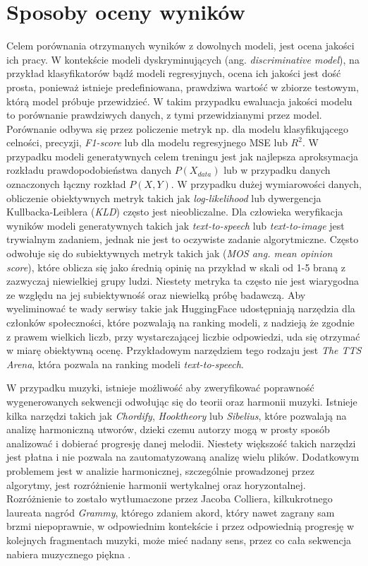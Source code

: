 \documentclass[data-science]{agh-wi} %
\begin{document}
\section{Sposoby oceny wyników}
Celem porównania otrzymanych wyników z dowolnych modeli, jest ocena jakości ich pracy. W kontekście modeli dyskryminujących (ang. \textit{discriminative model}), na przykład klasyfikatorów bądź modeli regresyjnych, ocena ich jakości jest dość prosta, ponieważ istnieje predefiniowana, prawdziwa wartość w zbiorze testowym, którą model próbuje przewidzieć. W takim przypadku ewaluacja jakości modelu to porównanie prawdziwych danych, z tymi przewidzianymi przez model. Porównanie odbywa się przez policzenie metryk np. dla modelu klasyfikującego celności, precyzji, \textit{F1-score} lub dla modelu regresyjnego MSE lub $R^2$. W przypadku modeli generatywnych celem treningu jest jak najlepsza aproksymacja rozkładu prawdopodobieństwa danych $P(X_{data})$ lub w przypadku danych oznaczonych łączny rozkład $P(X, Y)$. W przypadku dużej wymiarowości danych, obliczenie obiektywnych metryk takich jak \textit{log-likelihood} lub dywergencja Kullbacka-Leiblera (\textit{KLD}) często jest nieobliczalne. Dla człowieka weryfikacja wyników modeli generatywnych takich jak \textit{text-to-speech} lub \textit{text-to-image} jest trywialnym zadaniem, jednak nie jest to oczywiste zadanie algorytmiczne. Często odwołuje się do subiektywnych metryk takich jak (\textit{MOS ang. mean opinion score}), które oblicza się jako średnią opinię na przykład w skali od 1-5 braną z zazwyczaj niewielkiej grupy ludzi. Niestety metryka ta często nie jest wiarygodna ze względu na jej subiektywnośś oraz niewielką próbę badawczą. Aby wyeliminować te wady serwisy takie jak HuggingFace udostępniają narzędzia dla członków społeczności, które pozwalają na ranking modeli, z nadzieją że zgodnie z prawem wielkich liczb, przy wystarczającej liczbie odpowiedzi, uda się otrzymać w miarę obiektywną ocenę. Przykładowym narzędziem tego rodzaju jest \textit{The TTS Arena}\cite{tts_arena}, która pozwala na ranking modeli \textit{text-to-speech}.

W przypadku muzyki, istnieje możliwość aby zweryfikować poprawność wygenerowanych sekwencji odwołując się do teorii oraz harmonii muzyki. Istnieje kilka narzędzi takich jak \textit{Chordify}, \textit{Hooktheory} lub \textit{Sibelius}, które pozwalają na analizę harmoniczną utworów, dzieki czemu autorzy mogą w prosty sposób analizować i dobierać progresję danej melodii. Niestety większość takich narzędzi jest płatna i nie pozwala na zautomatyzowaną analizę wielu plików. Dodatkowym problemem jest w analizie harmonicznej, szczególnie prowadzonej przez algorytmy, jest rozróżnienie harmonii wertykalnej oraz horyzontalnej. Rozróżnienie to zostało wytłumaczone przez Jacoba Colliera, kilkukrotnego laureata nagród \textit{Grammy}, którego zdaniem akord, który nawet zagrany sam brzmi niepoprawnie, w odpowiednim kontekście i przez odpowiednią progresję w kolejnych fragmentach muzyki, może mieć nadany sens, przez co cała sekwencja nabiera muzycznego piękna \cite{collier_wrongnote}.
\end{document}
